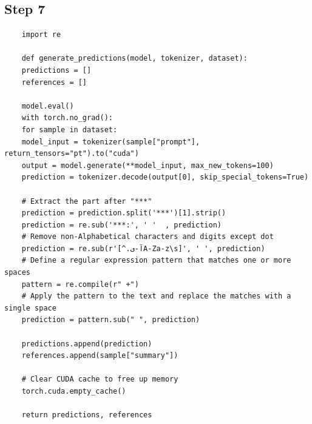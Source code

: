\documentclass{solutionclass} %
\begin{document}
\subsection*{Step 7}


\begin{lstlisting}
	import re
	
	def generate_predictions(model, tokenizer, dataset):
	predictions = []
	references = []
	
	model.eval()
	with torch.no_grad():
	for sample in dataset:
	model_input = tokenizer(sample["prompt"], return_tensors="pt").to("cuda")
	output = model.generate(**model_input, max_new_tokens=100)
	prediction = tokenizer.decode(output[0], skip_special_tokens=True)
	
	# Extract the part after "***"
	prediction = prediction.split('***')[1].strip()
	prediction = re.sub('***:', ' '  , prediction)
	# Remove non-Alphabetical characters and digits except dot
	prediction = re.sub(r'[^.آ-یA-Za-z\s]', ' ', prediction)
	# Define a regular expression pattern that matches one or more spaces
	pattern = re.compile(r" +")
	# Apply the pattern to the text and replace the matches with a single space
	prediction = pattern.sub(" ", prediction)
	
	predictions.append(prediction)
	references.append(sample["summary"])
	
	# Clear CUDA cache to free up memory
	torch.cuda.empty_cache()
	
	return predictions, references
\end{lstlisting}
\end{document}
